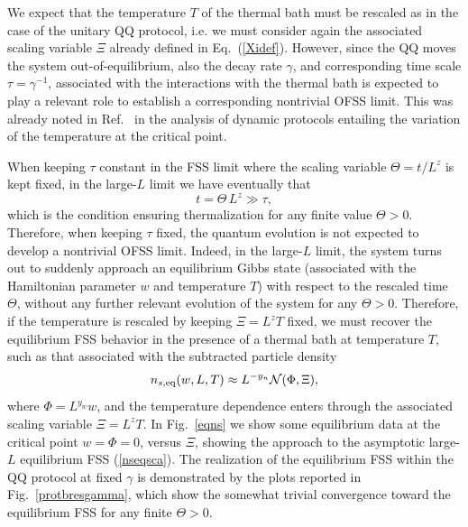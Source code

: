 We expect that the temperature $T$ of the thermal bath must be
rescaled as in the case of the unitary QQ protocol, i.e. we must
consider again the associated scaling variable $\Xi$ already defined
in Eq.~(\ref{Xidef}).  However, since the QQ moves the system
out-of-equilibrium, also the decay rate $\gamma$, and corresponding
time scale $\tau=\gamma^{-1}$, associated with the interactions with
the thermal bath is expected to play a relevant role to establish a
corresponding nontrivial OFSS limit.  This was already noted in
Ref.~\cite{BD-23} in the analysis of dynamic protocols entailing the
variation of the temperature at the critical point.

When keeping $\tau$ constant in the FSS limit where the
scaling variable $\Theta=t/L^z$ is kept fixed, in the large-$L$ limit
we have eventually that
\begin{equation}
  t = \Theta \, L^z \gg \tau,
  \label{tggtau}
  \end{equation}
which is the condition ensuring thermalization for any finite value
$\Theta>0$. Therefore, when keeping $\tau$ fixed, the quantum
evolution is not expected to develop a nontrivial OFSS limit. Indeed,
in the large-$L$ limit, the system turns out to suddenly approach an
equilibrium Gibbs state (associated with the Hamiltonian parameter $w$
and temperature $T$) with respect to the rescaled time $\Theta$,
without any further relevant evolution of the system for any
$\Theta>0$.  Therefore, if the temperature is rescaled by keeping
$\Xi=L^z T$ fixed, we must recover the equilibrium FSS behavior in the
presence of a thermal bath at temperature $T$, such as that associated
with the subtracted particle density~\cite{CV2014,rossini2021coherent}
\begin{equation}
  n_{s,{\rm eq}}(w,L,T) \approx L^{-y_n} {\cal N}(\Phi,\Xi),
  \label{nseqsca}
  \end{equation}
where $\Phi=L^{y_w} w$, and the temperature dependence enters through
the associated scaling variable $\Xi=L^z T$.  In Fig.~\ref{eqns} we
show some equilibrium data at the critical point $w=\Phi=0$, versus
$\Xi$, showing the approach to the asymptotic large-$L$ equilibrium
FSS (\ref{nseqsca}).  The realization of the equilibrium FSS within
the QQ protocol at fixed $\gamma$ is demonstrated by the plots
reported in Fig.~\ref{protbresgamma}, which show the somewhat trivial
convergence toward the equilibrium FSS for any finite $\Theta>0$.

